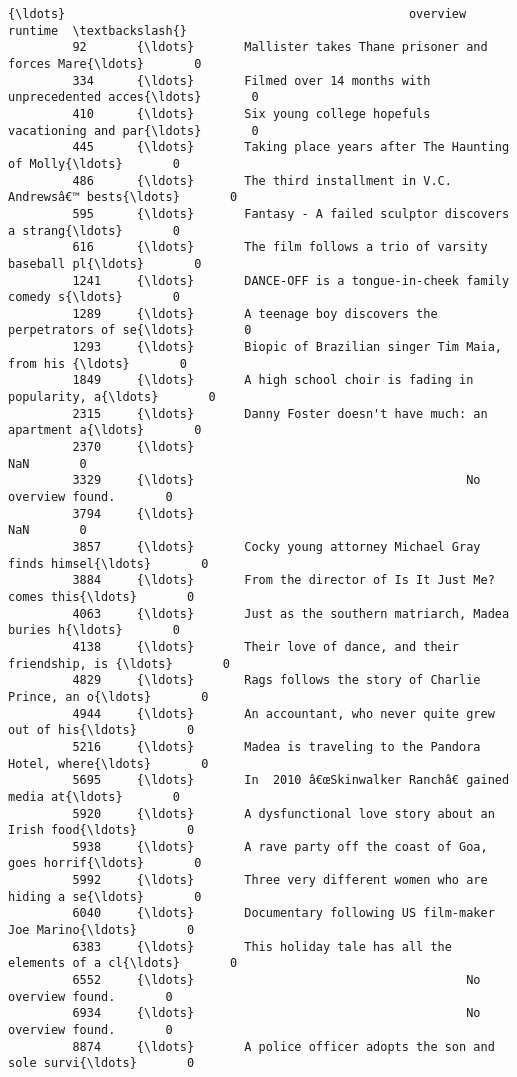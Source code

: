 \documentclass[11pt]{article}
\begin{document}
\begin{Verbatim}[commandchars=\\\{\}]
                  {\ldots}                                                overview runtime  \textbackslash{}
         92       {\ldots}       Mallister takes Thane prisoner and forces Mare{\ldots}       0   
         334      {\ldots}       Filmed over 14 months with unprecedented acces{\ldots}       0   
         410      {\ldots}       Six young college hopefuls vacationing and par{\ldots}       0   
         445      {\ldots}       Taking place years after The Haunting of Molly{\ldots}       0   
         486      {\ldots}       The third installment in V.C. Andrewsâ€™ bests{\ldots}       0   
         595      {\ldots}       Fantasy - A failed sculptor discovers a strang{\ldots}       0   
         616      {\ldots}       The film follows a trio of varsity baseball pl{\ldots}       0   
         1241     {\ldots}       DANCE-OFF is a tongue-in-cheek family comedy s{\ldots}       0   
         1289     {\ldots}       A teenage boy discovers the perpetrators of se{\ldots}       0   
         1293     {\ldots}       Biopic of Brazilian singer Tim Maia, from his {\ldots}       0   
         1849     {\ldots}       A high school choir is fading in popularity, a{\ldots}       0   
         2315     {\ldots}       Danny Foster doesn't have much: an apartment a{\ldots}       0   
         2370     {\ldots}                                                     NaN       0   
         3329     {\ldots}                                      No overview found.       0   
         3794     {\ldots}                                                     NaN       0   
         3857     {\ldots}       Cocky young attorney Michael Gray finds himsel{\ldots}       0   
         3884     {\ldots}       From the director of Is It Just Me? comes this{\ldots}       0   
         4063     {\ldots}       Just as the southern matriarch, Madea buries h{\ldots}       0   
         4138     {\ldots}       Their love of dance, and their friendship, is {\ldots}       0   
         4829     {\ldots}       Rags follows the story of Charlie Prince, an o{\ldots}       0   
         4944     {\ldots}       An accountant, who never quite grew out of his{\ldots}       0   
         5216     {\ldots}       Madea is traveling to the Pandora Hotel, where{\ldots}       0   
         5695     {\ldots}       In  2010 â€œSkinwalker Ranchâ€ gained media at{\ldots}       0   
         5920     {\ldots}       A dysfunctional love story about an Irish food{\ldots}       0   
         5938     {\ldots}       A rave party off the coast of Goa, goes horrif{\ldots}       0   
         5992     {\ldots}       Three very different women who are hiding a se{\ldots}       0   
         6040     {\ldots}       Documentary following US film-maker Joe Marino{\ldots}       0   
         6383     {\ldots}       This holiday tale has all the elements of a cl{\ldots}       0   
         6552     {\ldots}                                      No overview found.       0   
         6934     {\ldots}                                      No overview found.       0   
         8874     {\ldots}       A police officer adopts the son and sole survi{\ldots}       0   
         

\end{Verbatim}
\end{document}
